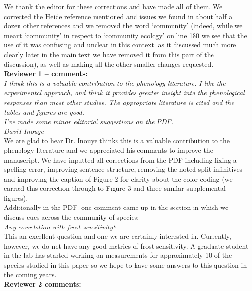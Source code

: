 \documentclass[11pt,a4paper]{article}
\begin{document}
We thank the editor for these corrections and have made all of them. We corrected the Heide reference mentioned and issues we found in about half a dozen other references and we removed the word `community' (indeed, while we meant `community' in respect to `community ecology' on line 180 we see that the use of it was confusing and unclear in this context; as it discussed much more clearly later in the main text we have removed it from this part of the discussion), as well as making all the other smaller changes requested. \\

{\bf Reviewer 1 -- comments:} \\

\emph{I think this is a valuable contribution to the phenology literature. I like the experimental approach, and think it provides greater insight into the phenological responses than most other studies.  The appropriate literature is cited and the tables and figures are good.\\
I've made some minor editorial suggestions on the PDF.\\
David Inouye}\\

We are glad to hear Dr. Inouye thinks this is a valuable contribution to the phenology literature and we appreciated his comments to improve the manuscript. We have inputted all corrections from the PDF including fixing a spelling error, improving sentence structure, removing the noted split infinitives and improving the caption of Figure 2 for clarity about the color coding (we carried this correction through to Figure 3 and three similar supplemental figures). \\

Additionally in the PDF, one comment came up in the section in which we discuss cues across the community of species:\\

\emph{Any correlation with frost sensitivity?}\\

This an excellent question and one we are certainly interested in. Currently, however, we do not have any good metrics of frost sensitivity. A graduate student in the lab has started working on measurements for approximately 10 of the species studied in this paper so we hope to have some answers to this question in the coming years.\\

{\bf Reviewer 2 comments:} \\
\end{document}
